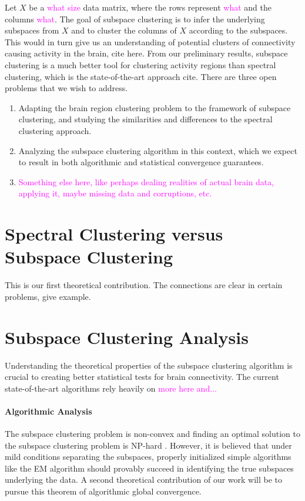 \documentclass[times,11pt]{article} %
\newcommand{\laura}{\textcolor{magenta}}
\begin{document}
Let $X$ be a \laura{what size} data matrix, where the rows represent \laura{what} and the columns \laura{what}. 
The goal of subspace clustering is to infer the underlying subspaces from $X$ and to cluster the columns of $X$ according to the subspaces. This would in turn give us an understanding of potential clusters of connectivity causing activity in the brain, cite here. From our preliminary results, subspace clustering is a much better tool for clustering activity regions than spectral clustering, which is the state-of-the-art approach cite. There are three open problems that we wish to address. 

\begin{enumerate}
\item Adapting the brain region clustering problem to the framework of subspace clustering, and studying the similarities and differences to the spectral clustering approach.
\item Analyzing the subspace clustering algorithm in this context, which we expect to result in both algorithmic and statistical convergence guarantees.
\item \laura{Something else here, like perhaps dealing realities of actual brain data, applying it, maybe missing data and corruptions, etc.}
\end{enumerate}


\section{Spectral Clustering versus Subspace Clustering}

This is our first theoretical contribution. The connections are clear in certain problems, give example.

\section{Subspace Clustering Analysis} Understanding the theoretical properties of the subspace clustering algorithm is crucial to creating better statistical tests for brain connectivity. The current state-of-the-art algorithms rely heavily on \laura{more here and...}


\paragraph{Algorithmic Analysis} The subspace clustering problem is non-convex and finding an optimal solution to the subspace clustering problem is NP-hard \cite{vidaltutorial}. However, it is believed that under mild conditions separating the subspaces, properly initialized simple algorithms like the EM algorithm should provably succeed in identifying the true subspaces underlying the data. A second theoretical contribution of our work will be to pursue this theorem of algorithmic global convergence.
\end{document}
